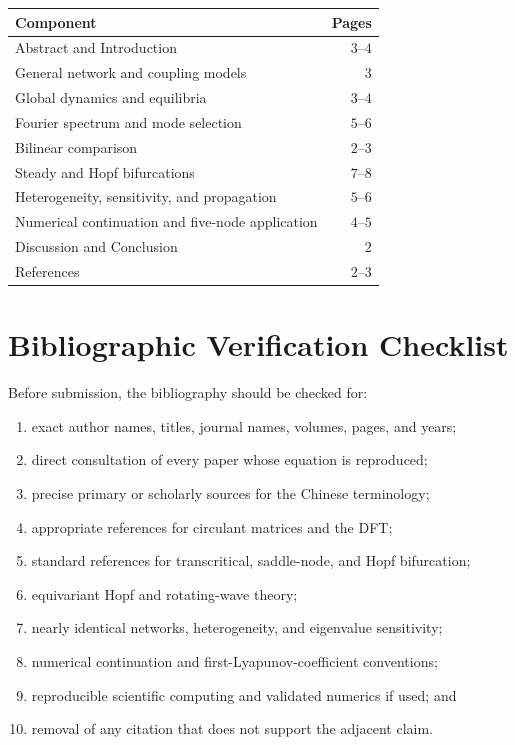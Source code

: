 \documentclass[11pt, reqno]{amsart}
\theoremstyle{definition}
\theoremstyle{remark}
\begin{document}
\begin{center}
\begin{tabular}{p{8.5cm}r}
\toprule
Component & Pages \\
\midrule
Abstract and Introduction & $3$--$4$ \\
General network and coupling models & $3$ \\
Global dynamics and equilibria & $3$--$4$ \\
Fourier spectrum and mode selection & $5$--$6$ \\
Bilinear comparison & $2$--$3$ \\
Steady and Hopf bifurcations & $7$--$8$ \\
Heterogeneity, sensitivity, and propagation & $5$--$6$ \\
Numerical continuation and five-node application & $4$--$5$ \\
Discussion and Conclusion & $2$ \\
References & $2$--$3$ \\
\bottomrule
\end{tabular}
\end{center}

\section{Bibliographic Verification Checklist}
\label{app:bibliography-checklist}

Before submission, the bibliography should be checked for:
\begin{enumerate}[label=(\arabic*),leftmargin=2.5em]
    \item exact author names, titles, journal names, volumes, pages, and years;
    \item direct consultation of every paper whose equation is reproduced;
    \item precise primary or scholarly sources for the Chinese terminology;
    \item appropriate references for circulant matrices and the DFT;
    \item standard references for transcritical, saddle-node, and Hopf
    bifurcation;
    \item equivariant Hopf and rotating-wave theory;
    \item nearly identical networks, heterogeneity, and eigenvalue sensitivity;
    \item numerical continuation and first-Lyapunov-coefficient conventions;
    \item reproducible scientific computing and validated numerics if used; and
    \item removal of any citation that does not support the adjacent claim.
\end{enumerate}
\end{document}
